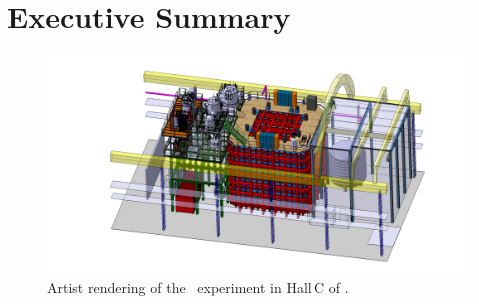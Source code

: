 \section{Executive Summary}
\label{sec:ExecutiveSummary}


\vspace{1cm}

\begin{figure}[t!]
\vspace*{-3cm}\includegraphics[width=1.5\textwidth, angle=270]{./Figures/assembly_sequence_11_07/58.png}
\caption[Artist rendering of the \DSks\ experiment in Hall C of \LNGS]{Artist rendering of the \DSks\ experiment in Hall\,C of \LNGS.}
\label{fig:Overall-Design}
\end{figure}

